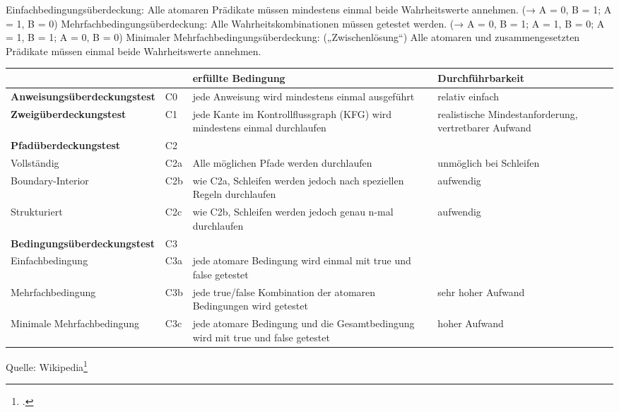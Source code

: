 \documentclass{lehramt-informatik-haupt}
\begin{document}
Einfachbedingungsüberdeckung:
Alle atomaren Prädikate müssen mindestens einmal beide Wahrheitswerte
annehmen.
(→ A = 0, B = 1; A = 1, B = 0)
Mehrfachbedingungsüberdeckung:
Alle Wahrheitskombinationen müssen getestet werden.
(→ A = 0, B = 1; A = 1, B = 0; A = 1, B = 1; A = 0, B = 0)
Minimaler Mehrfachbedingungsüberdeckung: („Zwischenlösung“)
Alle atomaren und zusammengesetzten Prädikate müssen einmal beide
Wahrheitswerte annehmen.

{
\footnotesize
\noindent
\begin{tabular}{llL{4cm}L{3cm}}
&
&
\textbf{erfüllte Bedingung} &
\textbf{Durchführbarkeit}
\\

\hline

%

\textbf{Anweisungsüberdeckungstest}
&
C0 &
jede Anweisung wird mindestens einmal ausgeführt &
relativ einfach \\

\hline

%

\textbf{Zweigüberdeckungstest} &
C1 &
jede Kante im Kontrollflussgraph (KFG) wird mindestens einmal durchlaufen &
realistische Mindestanforderung, vertretbarer Aufwand \\

\hline

%

\textbf{Pfadüberdeckungstest} &
C2 &
&
\\

Vollständig &
C2a &
Alle möglichen Pfade werden durchlaufen &
unmöglich bei Schleifen \\

Boundary-Interior &
C2b &
wie C2a, Schleifen werden jedoch nach speziellen Regeln durchlaufen &
aufwendig \\

Strukturiert &
C2c &
wie C2b, Schleifen werden jedoch genau n-mal durchlaufen &
aufwendig \\

\hline

%

\textbf{Bedingungsüberdeckungstest} &
C3 &
&
\\

Einfachbedingung &
C3a &
jede atomare Bedingung wird einmal mit true und false getestet &
\\

Mehrfachbedingung &
C3b &
jede true/false Kombination der atomaren Bedingungen wird getestet &
sehr hoher Aufwand \\

Minimale Mehrfachbedingung &
C3c &
jede atomare Bedingung und die Gesamtbedingung wird mit true und false getestet &
hoher Aufwand\\
\end{tabular}

Quelle: Wikipedia\footcite{wiki:kontrollfluss-test}
}
\end{document}
